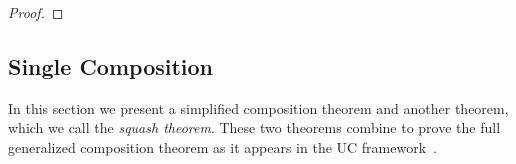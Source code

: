 \begin{proof}
%
%
%
%
%
\end{proof}

\subsection{Single Composition}
In this section we present a simplified composition theorem and another theorem, which we call the \textit{squash theorem}.
These two theorems combine to prove the full generalized composition theorem as it appears in the UC framework~\cite{uc}.

